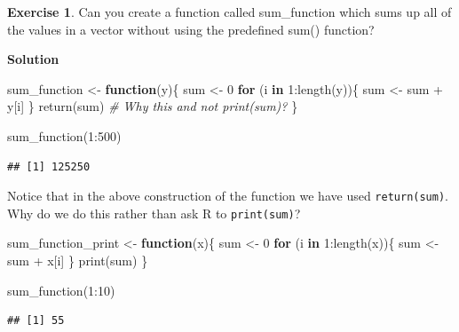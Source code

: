 \documentclass[
]{book}
\newenvironment{Shaded}{\begin{snugshade}}{\end{snugshade}}
\newcommand{\CommentTok}[1]{\textcolor[rgb]{0.56,0.35,0.01}{\textit{#1}}}
\newcommand{\ControlFlowTok}[1]{\textcolor[rgb]{0.13,0.29,0.53}{\textbf{#1}}}
\newcommand{\DecValTok}[1]{\textcolor[rgb]{0.00,0.00,0.81}{#1}}
\newcommand{\FunctionTok}[1]{\textcolor[rgb]{0.00,0.00,0.00}{#1}}
\newcommand{\NormalTok}[1]{#1}
\newcommand{\OtherTok}[1]{\textcolor[rgb]{0.56,0.35,0.01}{#1}}
\newcommand{\SpecialCharTok}[1]{\textcolor[rgb]{0.00,0.00,0.00}{#1}}
\theoremstyle{definition}
\theoremstyle{definition}
\theoremstyle{definition}
\newtheorem{exercise}{Exercise}[chapter]
\theoremstyle{definition}
\theoremstyle{remark}
\begin{document}
\begin{exercise}
Can you create a function called sum\_function which sums up all of the values in a vector without using the predefined sum() function?
\end{exercise}

\textbf{Solution}

\begin{Shaded}
\begin{Highlighting}[]
\NormalTok{sum\_function }\OtherTok{\textless{}{-}} \ControlFlowTok{function}\NormalTok{(y)\{}
\NormalTok{  sum }\OtherTok{\textless{}{-}} \DecValTok{0}
  \ControlFlowTok{for}\NormalTok{ (i }\ControlFlowTok{in} \DecValTok{1}\SpecialCharTok{:}\FunctionTok{length}\NormalTok{(y))\{}
\NormalTok{    sum }\OtherTok{\textless{}{-}}\NormalTok{ sum }\SpecialCharTok{+}\NormalTok{ y[i]}
\NormalTok{  \}}
  \FunctionTok{return}\NormalTok{(sum) }\CommentTok{\# Why this and not print(sum)?}
\NormalTok{\}}

\FunctionTok{sum\_function}\NormalTok{(}\DecValTok{1}\SpecialCharTok{:}\DecValTok{500}\NormalTok{)}
\end{Highlighting}
\end{Shaded}

\begin{verbatim}
## [1] 125250
\end{verbatim}

Notice that in the above construction of the function we have used \texttt{return(sum)}. Why do we do this rather than ask R to \texttt{print(sum)}?

\begin{Shaded}
\begin{Highlighting}[]
\NormalTok{sum\_function\_print }\OtherTok{\textless{}{-}} \ControlFlowTok{function}\NormalTok{(x)\{}
\NormalTok{  sum }\OtherTok{\textless{}{-}} \DecValTok{0}
  \ControlFlowTok{for}\NormalTok{ (i }\ControlFlowTok{in} \DecValTok{1}\SpecialCharTok{:}\FunctionTok{length}\NormalTok{(x))\{}
\NormalTok{    sum }\OtherTok{\textless{}{-}}\NormalTok{ sum }\SpecialCharTok{+}\NormalTok{ x[i]}
\NormalTok{  \}}
  \FunctionTok{print}\NormalTok{(sum)}
\NormalTok{\}}

\FunctionTok{sum\_function}\NormalTok{(}\DecValTok{1}\SpecialCharTok{:}\DecValTok{10}\NormalTok{)}
\end{Highlighting}
\end{Shaded}

\begin{verbatim}
## [1] 55
\end{verbatim}
\end{document}
